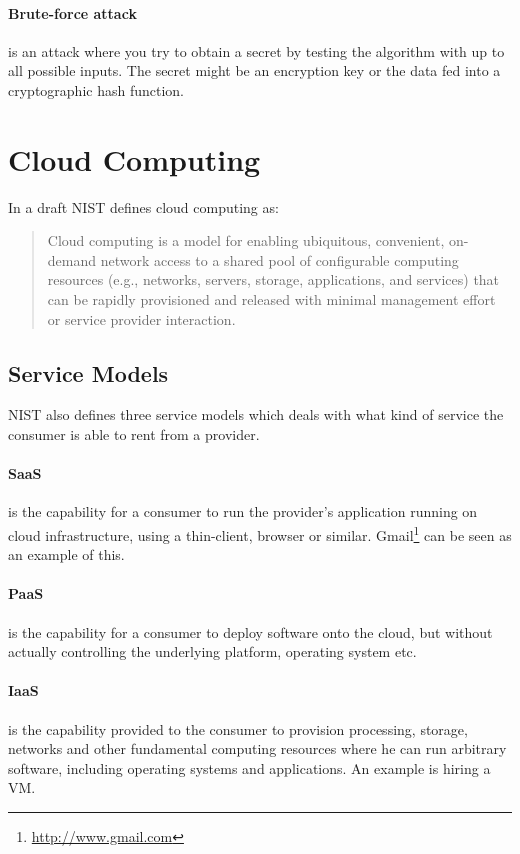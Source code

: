 \documentclass[pdftex,english,10pt,b5paper,twoside]{book}
\begin{document}
\paragraph{Brute-force attack} is an attack where you try to obtain a secret by
testing the algorithm with up to all possible inputs. The secret might be an
encryption key or the data fed into a cryptographic hash function.

\section{Cloud Computing}
In a draft\cite{cloud_nistdef} \ac{NIST} defines cloud computing as:
\begin{quote}
Cloud computing is a model for enabling ubiquitous, convenient,
on-demand network access to a shared pool of configurable computing resources
(e.g., networks, servers, storage, applications, and services) that can be
rapidly provisioned and released with minimal management effort or service
provider interaction.
\end{quote}

\subsection{Service Models}
\ac{NIST} also defines three service models which deals with what kind of
service the consumer is able to rent from a provider.

\paragraph{\ac{SaaS}} is the capability for a consumer to run the provider's
application running on cloud infrastructure, using a thin-client, browser or
similar. Gmail\footnote{\url{http://www.gmail.com}} can be seen as an example
of this.

\paragraph{\ac{PaaS}} is the capability for a consumer to deploy software onto
the cloud, but without actually controlling the underlying platform, operating
system etc.

\paragraph{\ac{IaaS}} is the capability provided to the consumer to provision
processing, storage, networks and other fundamental computing resources where
he can run arbitrary software, including operating systems and applications. An
example is hiring a \ac{VM}.
\end{document}
